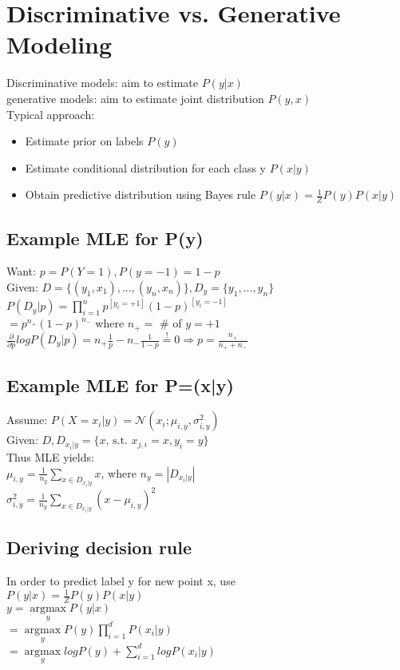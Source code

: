 \section*{Discriminative vs. Generative Modeling}
Discriminative models: aim to estimate $P(y|x)$\\
generative models:  aim to estimate joint distribution $P(y,x)$\\

Typical approach:
\begin{itemize}
	\item Estimate prior on labels $P(y)$
	\item Estimate conditional distribution for each class y $P(x|y)$
	\item Obtain predictive distribution using Bayes rule $P(y|x) = \frac{1}{Z} P(y) P(x|y)$
\end{itemize}

\subsection*{Example MLE for P(y)}
Want: $p = P(Y=1), P(y=-1) = 1-p$\\
Given: $D=\{(y_1,x_1),...,(y_n,x_n)\}, D_y=\{y_1,...,y_n\}$\\
$P(D_y|p) = \prod_{i=1}^n p^{[y_i=+1]} (1-p)^{[y_i=-1]}$\\
$=p^{n_+} (1-p)^{n_-}$ where $n_+ = $ # of $y=+1$\\
$\frac{\partial}{\partial p} log P(D_y|p) = n_+ \frac{1}{p} - n_- \frac{1}{1-p} \overset{!}{=} 0 \Rightarrow p=\frac{n_+}{n_+ + n_-}$

\subsection*{Example MLE for P=(x|y)}
Assume: $P(X=x_i|y) = \mathcal{N}(x_i;\mu_{i,y}, \sigma_{i,y}^2)$\\
Given: $D, D_{x_i|y} = \{x \text{, s.t. } x_{j,i}=x, y_i=y\}$\\
Thus MLE yields:\\
$\mu_{i,y} = \frac{1}{n_y} \sum_{x\in D_{x_i|y}} x$, where $n_y=|D_{x_i|y}|$\\
$\sigma_{i,y}^2 = \frac{1}{n_y} \sum_{x\in D_{x_i|y}} (x-\mu_{i,y})^2$

\subsection*{Deriving decision rule}
In order to predict label y for new point x, use\\
$P(y|x) = \frac{1}{Z} P(y)P(x|y)$\\
$y = \underset{y}{\operatorname{argmax}} P(y|x)$\\
$= \underset{y}{\operatorname{argmax}} P(y) \prod_{i=1}^d P(x_i|y)$\\
$= \underset{y}{\operatorname{argmax}} log P(y) + \sum_{i=1}^d log P(x_i|y)$

